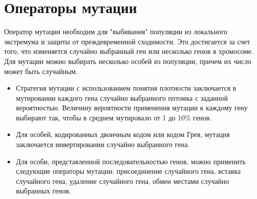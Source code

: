 \section{Операторы мутации}
Оператор мутации необходим для "выбивания" популяции из локального экстремума и защиты от преждевременной сходимости. Это достигается за счет того, что изменяется случайно выбранный ген или несколько генов в хромосоме. Для мутации можно выбирать несколько особей из популяции, причем их число может быть случайным.
\begin{itemize}[label=$\ast$]
	\item {}

Стратегия мутации с использованием понятия плотности заключается в мутировании каждого гена случайно выбранного потомка с заданной вероятностью. Величину вероятности применения мутации к каждому гену выбирают так, чтобы в среднем мутировало от 1 до 10\% генов.
	\item {}

Для особей, кодированных двоичным кодом или кодом Грея, мутация заключается инвертировании случайно выбранного гена.
	\item {}

Для особи, представленной последовательностью генов, можно применить следующие операторы мутации: присоединение случайного гена, вставка случайного гена, удаление случайного гена, обмен местами случайно выбранных генов.
\end{itemize}

